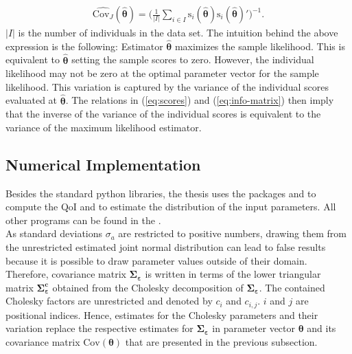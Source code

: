 \documentclass[a4paper,12pt]{article}
\begin{document}
\begin{align} \label{eq:est-cov}
\hat{\text{Cov}_J}(\pmb{\hat{\theta}}) = \bigg( \frac{1}{|I|} \sum_{i \in I} \text{s}_i(\pmb{\hat{\theta}})\text{s}_i(\pmb{\hat{\theta}})' \bigg)^{-1}.
\end{align}
$|I|$ is the number of individuals in the data set.
The intuition behind the above expression is the following: Estimator $\pmb{\hat{\theta}}$ maximizes the sample likelihood. This is equivalent to $\pmb{\hat{\theta}}$ setting the sample scores to zero. However, the individual likelihood may not be zero at the optimal parameter vector for the sample likelihood. This variation is captured by the variance of the individual scores evaluated at $\pmb{\hat{\theta}}$. The relations in (\ref{eq:scores}) and (\ref{eq:info-matrix}) then imply that the inverse of the variance of the individual scores is equivalent to the variance of the maximum likelihood estimator.
\subsection{Numerical Implementation}

Besides the standard python libraries, the thesis uses the packages  and  to compute the QoI and to estimate the distribution of the input parameters. All other programs can be found in the  .\\

\noindent
As standard deviations $\sigma_{a}$ are restricted to positive numbers, drawing them from the unrestricted estimated joint normal distribution can lead to false results because it is possible to draw parameter values outside of their domain. Therefore, covariance matrix $\pmb{\Sigma_\varepsilon}$ is written in terms of the lower triangular matrix $\pmb{\Sigma_\varepsilon^c}$ obtained from the Cholesky decomposition of $\pmb{\Sigma_\varepsilon}$. The contained Cholesky factors are unrestricted and denoted by $c_{i}$ and $c_{i,j}$. $i$ and $j$ are positional indices. Hence, estimates for the Cholesky parameters and their variation replace the respective estimates for $\pmb{\Sigma_\varepsilon}$ in parameter vector $\pmb{\theta}$ and its covariance matrix $\text{Cov}(\pmb{\theta})$ that are presented in the previous subsection.
\end{document}
